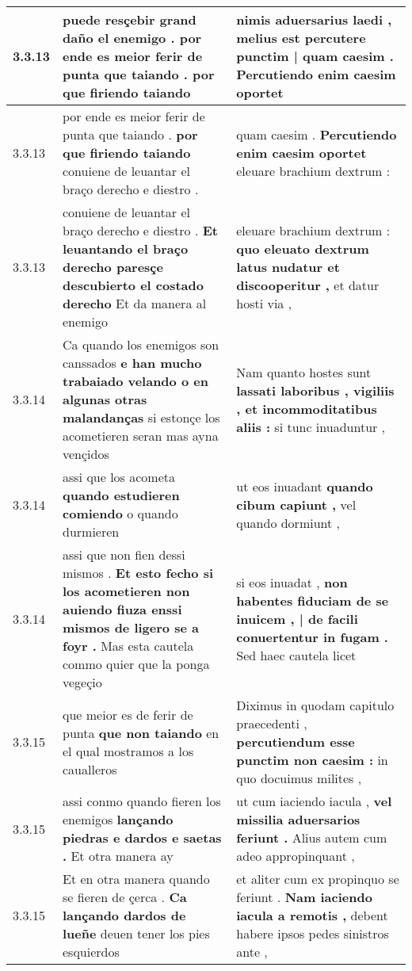 \begin{tabular}{|p{1cm}|p{6.5cm}|p{6.5cm}|}
3.3.13 & puede resçebir grand daño el enemigo . \textbf{ por ende es meior ferir de punta que taiando . } por que firiendo taiando & nimis aduersarius laedi , \textbf{ melius est percutere punctim | quam caesim . } Percutiendo enim caesim oportet \\\hline
3.3.13 & por ende es meior ferir de punta que taiando . \textbf{ por que firiendo taiando } conuiene de leuantar el braço derecho e diestro . & quam caesim . \textbf{ Percutiendo enim caesim oportet } eleuare brachium dextrum : \\\hline
3.3.13 & conuiene de leuantar el braço derecho e diestro . \textbf{ Et leuantando el braço derecho paresçe descubierto el costado derecho } Et da manera al enemigo & eleuare brachium dextrum : \textbf{ quo eleuato dextrum latus nudatur et discooperitur , } et datur hosti via , \\\hline
3.3.14 & Ca quando los enemigos son canssados \textbf{ e han mucho trabaiado velando o en algunas otras malandanças } si estonçe los acometieren seran mas ayna vençidos & Nam quanto hostes sunt \textbf{ lassati laboribus , vigiliis , et incommoditatibus aliis : } si tunc inuaduntur , \\\hline
3.3.14 & assi que los acometa \textbf{ quando estudieren comiendo } o quando durmieren & ut eos inuadant \textbf{ quando cibum capiunt , } vel quando dormiunt , \\\hline
3.3.14 & assi que non fien dessi mismos . \textbf{ Et esto fecho si los acometieren non auiendo fiuza enssi mismos de ligero se a foyr . } Mas esta cautela commo quier que la ponga vegeçio & si eos inuadat , \textbf{ non habentes fiduciam de se inuicem , | de facili conuertentur in fugam . } Sed haec cautela licet \\\hline
3.3.15 & que meior es de ferir de punta \textbf{ que non taiando } en el qual mostramos a los caualleros & Diximus in quodam capitulo praecedenti , \textbf{ percutiendum esse punctim non caesim : } in quo docuimus milites , \\\hline
3.3.15 & assi conmo quando fieren los enemigos \textbf{ lançando piedras e dardos e saetas . } Et otra manera ay & ut cum iaciendo iacula , \textbf{ vel missilia aduersarios feriunt . } Alius autem cum adeo appropinquant , \\\hline
3.3.15 & Et en otra manera quando se fieren de çerca . \textbf{ Ca lançando dardos de lueñe } deuen tener los pies esquierdos & et aliter cum ex propinquo se feriunt . \textbf{ Nam iaciendo iacula a remotis , } debent habere ipsos pedes sinistros ante , \\\hline

\end{tabular}
